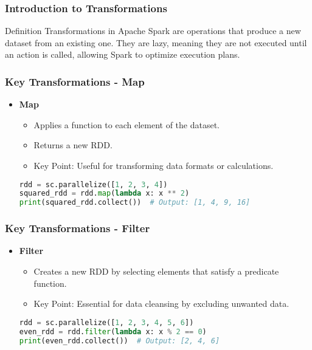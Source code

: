 \documentclass[aspectratio=169]{beamer}
\begin{document}
\begin{frame}[fragile]
    \frametitle{Introduction to Transformations}
    \begin{block}{Definition}
        Transformations in Apache Spark are operations that produce a new dataset from an existing one. 
        They are lazy, meaning they are not executed until an action is called, allowing Spark to optimize execution plans.
    \end{block}
\end{frame}

\begin{frame}[fragile]
    \frametitle{Key Transformations - Map}
    \begin{itemize}
        \item \textbf{Map}
        \begin{itemize}
            \item Applies a function to each element of the dataset.
            \item Returns a new RDD.
            \item Key Point: Useful for transforming data formats or calculations.
        \end{itemize}
        \begin{lstlisting}[language=python]
rdd = sc.parallelize([1, 2, 3, 4])
squared_rdd = rdd.map(lambda x: x ** 2)
print(squared_rdd.collect())  # Output: [1, 4, 9, 16]
        \end{lstlisting}
    \end{itemize}
\end{frame}

\begin{frame}[fragile]
    \frametitle{Key Transformations - Filter}
    \begin{itemize}
        \item \textbf{Filter}
        \begin{itemize}
            \item Creates a new RDD by selecting elements that satisfy a predicate function.
            \item Key Point: Essential for data cleansing by excluding unwanted data.
        \end{itemize}
        \begin{lstlisting}[language=python]
rdd = sc.parallelize([1, 2, 3, 4, 5, 6])
even_rdd = rdd.filter(lambda x: x % 2 == 0)
print(even_rdd.collect())  # Output: [2, 4, 6]
        \end{lstlisting}
    \end{itemize}
\end{frame}
\end{document}
